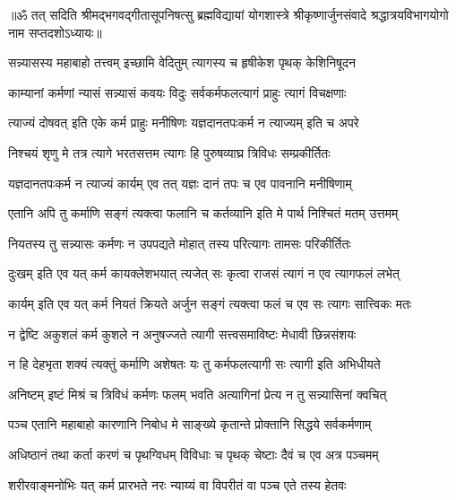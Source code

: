 {॥ॐ तत् सदिति श्रीमद्भगवद्गीतासूपनिषत्सु ब्रह्मविद्यायां योगशास्त्रे श्रीकृष्णार्जुनसंवादे श्रद्धात्रयविभागयोगो नाम सप्तदशोऽध्यायः॥}



\twolineshloka
{सन्न्यासस्य महाबाहो तत्त्वम् इच्छामि वेदितुम्}
{त्यागस्य च हृषीकेश पृथक् केशिनिषूदन}%


\twolineshloka
{काम्यानां कर्मणां न्यासं सन्न्यासं कवयः विदुः}
{सर्वकर्मफलत्यागं प्राहुः त्यागं विचक्षणाः}%

\twolineshloka
{त्याज्यं दोषवत् इति एके कर्म प्राहुः मनीषिणः}
{यज्ञदानतपःकर्म न त्याज्यम् इति च अपरे}%

\twolineshloka
{निश्चयं शृणु मे तत्र त्यागे भरतसत्तम}
{त्यागः हि पुरुषव्याघ्र त्रिविधः सम्प्रकीर्तितः}%

\twolineshloka
{यज्ञदानतपःकर्म न त्याज्यं कार्यम् एव तत्}
{यज्ञः दानं तपः च एव पावनानि मनीषिणाम्}%

\twolineshloka
{एतानि अपि तु कर्माणि सङ्गं त्यक्त्वा फलानि च}
{कर्तव्यानि इति मे पार्थ निश्चितं मतम् उत्तमम्}%

\twolineshloka
{नियतस्य तु सन्न्यासः कर्मणः न उपपद्यते}
{मोहात् तस्य परित्यागः तामसः परिकीर्तितः}%

\twolineshloka
{दुःखम् इति एव यत् कर्म कायक्लेशभयात् त्यजेत्}
{सः कृत्वा राजसं त्यागं न एव त्यागफलं लभेत्}%

\twolineshloka
{कार्यम् इति एव यत् कर्म नियतं क्रियते अर्जुन}
{सङ्गं त्यक्त्वा फलं च एव सः त्यागः सात्त्विकः मतः}%

\twolineshloka
{न द्वेष्टि अकुशलं कर्म कुशले न अनुषज्जते}
{त्यागी सत्त्वसमाविष्टः मेधावी छिन्नसंशयः}%

\twolineshloka
{न हि देहभृता शक्यं त्यक्तुं कर्माणि अशेषतः}
{यः तु कर्मफलत्यागी सः त्यागी इति अभिधीयते}%

\twolineshloka
{अनिष्टम् इष्टं मिश्रं च त्रिविधं कर्मणः फलम्}
{भवति अत्यागिनां प्रेत्य न तु सन्न्यासिनां क्वचित्}%

\twolineshloka
{पञ्च एतानि महाबाहो कारणानि निबोध मे}
{साङ्ख्ये कृतान्ते प्रोक्तानि सिद्धये सर्वकर्मणाम्}%

\twolineshloka
{अधिष्ठानं तथा कर्ता करणं च पृथग्विधम्}
{विविधाः च पृथक् चेष्टाः दैवं च एव अत्र पञ्चमम्}%

\twolineshloka
{शरीरवाङ्मनोभिः यत् कर्म प्रारभते नरः}
{न्याय्यं वा विपरीतं वा पञ्च एते तस्य हेतवः}%

